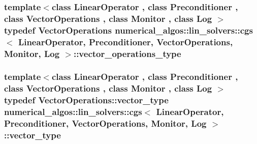 \hypertarget{classnumerical__algos_1_1lin__solvers_1_1cgs_a249281fa342a90567f6344a57191fde9}{
\subsubsection[{vector\-\_\-operations\-\_\-type}]{\setlength{\rightskip}{0pt plus 5cm}template$<$class Linear\-Operator , class Preconditioner , class Vector\-Operations , class Monitor , class Log $>$ typedef Vector\-Operations {\bf numerical\-\_\-algos\-::lin\-\_\-solvers\-::cgs}$<$ Linear\-Operator, Preconditioner, Vector\-Operations, Monitor, Log $>$\-::{\bf vector\-\_\-operations\-\_\-type}}}\label{classnumerical__algos_1_1lin__solvers_1_1cgs_a249281fa342a90567f6344a57191fde9}
\hypertarget{classnumerical__algos_1_1lin__solvers_1_1cgs_aed6c8f0092b08fb3d0690c215cced5f9}{
\subsubsection[{vector\-\_\-type}]{\setlength{\rightskip}{0pt plus 5cm}template$<$class Linear\-Operator , class Preconditioner , class Vector\-Operations , class Monitor , class Log $>$ typedef Vector\-Operations\-::vector\-\_\-type {\bf numerical\-\_\-algos\-::lin\-\_\-solvers\-::cgs}$<$ Linear\-Operator, Preconditioner, Vector\-Operations, Monitor, Log $>$\-::{\bf vector\-\_\-type}}}\label{classnumerical__algos_1_1lin__solvers_1_1cgs_aed6c8f0092b08fb3d0690c215cced5f9}


